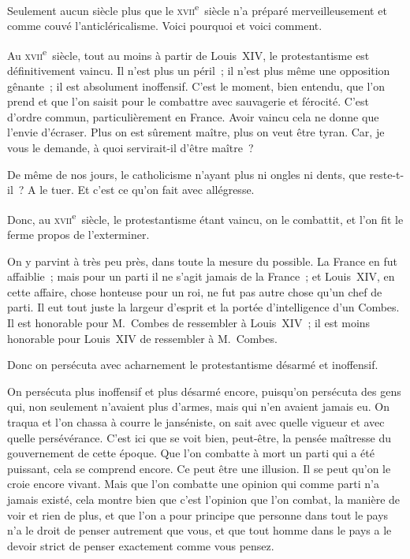 \documentclass[french,twoside]{book} %
\begin{document}
\noindent Seulement aucun siècle plus que le \textsc{xvii}\textsuperscript{e} siècle n’a préparé merveilleusement et comme couvé l’anticléricalisme. Voici pourquoi et voici comment.\par
 Au \textsc{xvii}\textsuperscript{e} siècle, tout au moins à partir de Louis XIV, le protestantisme est définitivement vaincu. Il n’est plus un péril ; il n’est plus même une opposition gênante ; il est absolument inoffensif. C’est le moment, bien entendu, que l’on prend et que l’on saisit pour le combattre avec sauvagerie et férocité. C’est d’ordre commun, particulièrement en France. Avoir vaincu cela ne donne que l’envie d’écraser. Plus on est sûrement maître, plus on veut être tyran. Car, je vous le demande, à quoi servirait-il d’être maître ?\par
De même de nos jours, le catholicisme n’ayant plus ni ongles ni dents, que reste-t-il ? A le tuer. Et c’est ce qu’on fait avec allégresse.\par
Donc, au \textsc{xvii}\textsuperscript{e} siècle, le protestantisme étant vaincu, on le combattit, et l’on fit le ferme propos de l’exterminer.\par
On y parvint à très peu près, dans toute la mesure du possible. La France en fut affaiblie ; mais pour un parti il ne s’agit jamais de la France ; et Louis XIV, en cette affaire, chose honteuse pour un roi, ne fut pas autre chose qu’un chef de parti. Il eut tout juste la largeur d’esprit et la portée d’intelligence d’un Combes. Il est honorable pour M. Combes de ressembler à Louis XIV ; il est moins honorable pour Louis XIV de ressembler à M. Combes.\par
 Donc on persécuta avec acharnement le protestantisme désarmé et inoffensif.\par
On persécuta plus inoffensif et plus désarmé encore, puisqu’on persécuta des gens qui, non seulement n’avaient plus d’armes, mais qui n’en avaient jamais eu. On traqua et l’on chassa à courre le janséniste, on sait avec quelle vigueur et avec quelle persévérance. C’est ici que se voit bien, peut-être, la pensée maîtresse du gouvernement de cette époque. Que l’on combatte à mort un parti qui a été puissant, cela se comprend encore. Ce peut être une illusion. Il se peut qu’on le croie encore vivant. Mais que l’on combatte une opinion qui comme parti n’a jamais existé, cela montre bien que c’est l’opinion que l’on combat, la manière de voir et rien de plus, et que l’on a pour principe que personne dans tout le pays n’a le droit de penser autrement que vous, et que tout homme dans le pays a le devoir strict de penser exactement comme vous pensez.\par
\end{document}

